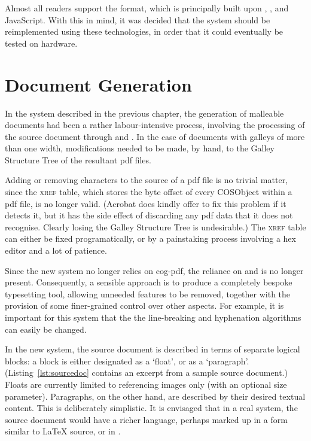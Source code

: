 Almost all \ebook{} readers support the \epub{} format, which is principally built upon \html{}, \css{}, and JavaScript. With this in mind, it was decided that the system should be  reimplemented using these technologies, in order that it could eventually be tested on \ebook{} hardware. 



\section{Document Generation}
\label{sec:docgen}

In the system described in the previous chapter, the generation of malleable documents had been a rather labour-intensive process, involving the processing of the source document through \ditroff{} and \pdfdit{}. In the case of documents with galleys of more than one width, modifications needed to be made, by hand, to the Galley Structure Tree of the resultant \gls{pdf} files.

Adding or removing characters to the source of a \gls{pdf} file is no trivial matter, since the \textsc{xref} table, which stores the byte offset of every \gls{COSObject} within a \gls{pdf} file, is no longer valid. (Acrobat does kindly offer to fix this problem if it detects it, but it has the side effect of discarding any \gls{pdf} data that it does not recognise. Clearly losing the Galley Structure Tree is undesirable.) The \textsc{xref} table can either be fixed programatically, or by a painstaking process involving a hex editor and a lot of  patience. 

Since the new system no longer relies on \gls{cog}-\gls{pdf}, the reliance on \troff{} and \pdfdit{} is no longer present. Consequently, a sensible approach is to produce a completely bespoke typesetting tool, allowing unneeded features to be removed, together with the provision of some finer-grained control over other aspects. For example, it is important for this system that the the line-breaking and hyphenation algorithms can easily be changed.

In the new system, the source document is described in terms of separate logical blocks: a block is either designated as a `float', or as a `paragraph'. (Listing~\ref{lst:sourcedoc} contains an excerpt from a sample source document.) Floats are currently limited to referencing images only (with an optional size parameter). Paragraphs, on the other hand, are described by their desired textual content. This is deliberately simplistic. It is envisaged that in a real system, the source document would have a richer language, perhaps marked up in a form similar to \LaTeX{} source, or in \xml{}.

